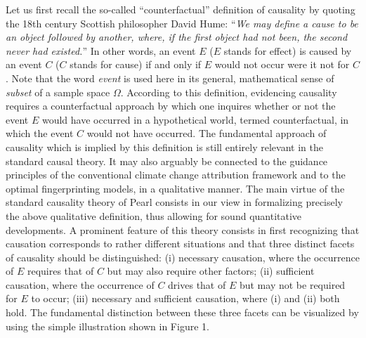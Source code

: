 \documentclass[12pt]{article}
\begin{document}
Let us first recall the so-called ``counterfactual'' definition of causality by quoting the 18th century Scottish philosopher David Hume: ``\textit{We may define a cause to be an object followed by another, where, if the first object had not been, the second never had existed.}''  In other words, an event $E$ ($E$ stands for effect) is caused by an event $C$ ($C$ stands for cause) if and only if $E$ would not occur were it not for $C$. Note that the word \textit{event} is used here in its general, mathematical sense of \textit{subset} of a sample space $\Omega$. According to this definition, evidencing causality requires a counterfactual approach by which one inquires whether or not the event $E$ would have occurred in a hypothetical world, termed counterfactual, in which the event $C$ would not have occurred. The fundamental approach of causality which is implied by this definition is still entirely relevant in the standard causal theory. It may also arguably be connected to the guidance principles of the conventional climate change attribution framework and to the optimal fingerprinting models, in a qualitative manner. %
The main virtue of the standard causality theory of Pearl consists in our view in formalizing precisely the above qualitative definition, thus allowing for sound quantitative developments. A prominent feature of this theory consists in first recognizing that causation corresponds to rather different situations and that three distinct facets of causality should be distinguished: (i) necessary causation, where the occurrence of $E$ requires that of $C$ but may also require other factors; (ii) sufficient causation, where the occurrence of $C$ drives that of $E$ but may not be required for $E$ to occur; (iii) necessary and sufficient causation, where (i) and (ii) both hold. The fundamental distinction between these three facets can be visualized by using the simple illustration shown in Figure 1. 
\end{document}
